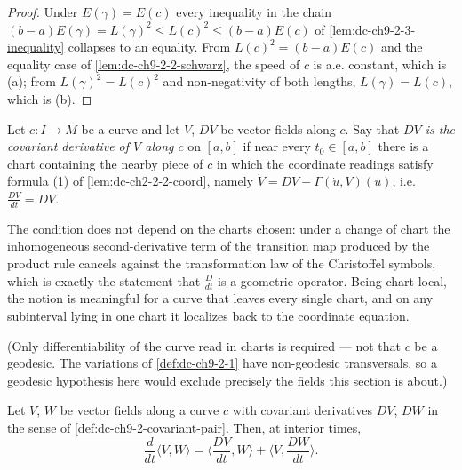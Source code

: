 \begin{proof}
  \leanok
  \sketch
  Under $E(\gamma)=E(c)$ every inequality in the chain
  $(b-a)E(\gamma)=L(\gamma)^2\le L(c)^2\le (b-a)E(c)$ of
  \cref{lem:dc-ch9-2-3-inequality} collapses to an equality. From $L(c)^2=(b-a)E(c)$ and the
  equality case of \cref{lem:dc-ch9-2-2-schwarz}, the speed of $c$ is a.e. constant, which is
  (a); from $L(\gamma)^2=L(c)^2$ and non-negativity of both lengths, $L(\gamma)=L(c)$, which
  is (b).
\end{proof}
\begin{definition}
  \label{def:dc-ch9-2-covariant-pair}
  \leanok
  Let $c:I\to M$ be a curve and let $V$, $DV$ be vector fields along $c$. Say that
  \emph{$DV$ is the covariant derivative of $V$ along $c$} on $[a,b]$ if near every
  $t_0\in[a,b]$ there is a chart containing the nearby piece of $c$ in which the
  coordinate readings satisfy formula (1) of \cref{lem:dc-ch2-2-2-coord}, namely
  $\dot V=DV-\Gamma(\dot u,V)(u)$, i.e. $\frac{DV}{dt}=DV$.

  The condition does not depend on the charts chosen: under a change of chart the
  inhomogeneous second-derivative term of the transition map produced by the product rule
  cancels against the transformation law of the Christoffel symbols, which is exactly the
  statement that $\frac{D}{dt}$ is a geometric operator. Being chart-local, the notion is
  meaningful for a curve that leaves every single chart, and on any subinterval lying in
  one chart it localizes back to the coordinate equation.

  (Only differentiability of the curve read in charts is required --- not that $c$ be a
  geodesic. The variations of \cref{def:dc-ch9-2-1} have non-geodesic transversals, so a
  geodesic hypothesis here would exclude precisely the fields this section is about.)
\end{definition}
\begin{lemma}
  \label{lem:dc-ch9-2-covariant-pair-leibniz}
  \leanok
  Let $V$, $W$ be vector fields along a curve $c$ with covariant derivatives $DV$, $DW$
  in the sense of \cref{def:dc-ch9-2-covariant-pair}. Then, at interior times,
  $$
  \frac{d}{dt}\langle V,W\rangle=\Big\langle\frac{DV}{dt},W\Big\rangle
    +\Big\langle V,\frac{DW}{dt}\Big\rangle.
  $$
\end{lemma}
